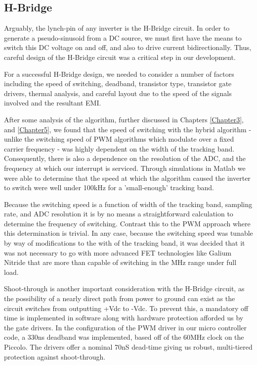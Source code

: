 \subsection{H-Bridge}
Arguably, the lynch-pin of any inverter is the H-Bridge circuit. In order to generate a pseudo-sinusoid from a DC source, we must first have the means to switch this DC voltage on and off, and also to drive current bidirectionally. Thus, careful design of the H-Bridge circuit was a critical step in our development.

For a successful H-Bridge design, we needed to consider a number of factors including the speed of switching, deadband, transistor type, transistor gate drivers, thermal analysis, and careful layout due to the speed of the signals involved and the resultant EMI.

After some analysis of the algorithm, further discussed in Chapters \ref{Chapter3}, and \ref{Chapter5}, we found that the speed of switching with the hybrid algorithm - unlike the switching speed of PWM algorithms which modulate over a fixed carrier frequency - was highly dependent on the width of the tracking band. Consequently, there is also a dependence on the resolution of the ADC, and the frequency at which our interrupt is serviced. Through simulations in Matlab we were able to determine that the speed at which the algorithm caused the inverter to switch were well under 100kHz for a 'small-enough' tracking band. 

Because the switching speed is a function of width of the tracking band, sampling rate, and ADC resolution it is by no means a straightforward calculation to determine the frequency of switching. Contrast this to the PWM approach where this determination is trivial. In any case, because the switching speed was tunable by way of modifications to the with of the tracking band, it was decided that it was not necessary to go with more advanced FET technologies like Galium Nitride that are more than capable of switching in the MHz range under full load. 

Shoot-through is another important consideration with the H-Bridge circuit, as the possibility of a nearly direct path from power to ground can exist as the circuit switches from outputting +Vdc to -Vdc. To prevent this, a mandatory off time is implemented in software along with  hardware protection afforded us by the gate drivers. In the configuration of the PWM driver in our micro controller code, a 330ns deadband was implemented, based off of the 60MHz clock on the Piccolo. The drivers offer a nominal 70nS dead-time giving us robust, multi-tiered protection against shoot-through. 

